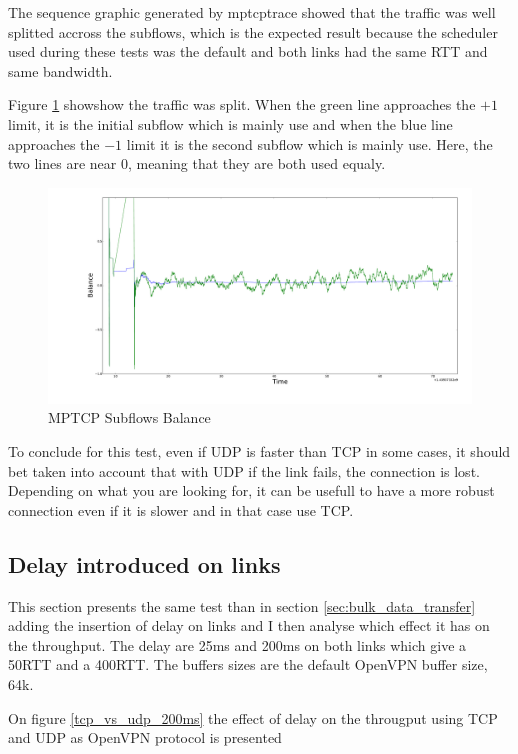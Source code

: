 The sequence graphic generated by mptcptrace showed that the traffic was well splitted accross the subflows, which is the expected result because the scheduler used during these tests was the default and both links had the same RTT and same bandwidth.

Figure \ref{mptcptrace_subflow} showshow the traffic was split. When the green line approaches the $+1$ limit,
it is the initial subflow which is mainly use and when the blue line approaches the $-1$ limit it is the second subflow which is mainly use.
Here, the two lines are near 0, meaning that they are both used equaly.

  \begin{figure}[h!]
    \centering
    \includegraphics[width=16cm]{../results/subflow_split.pdf}
    \caption{MPTCP Subflows Balance}
    \label{mptcptrace_subflow}
  \end{figure}

  To conclude for this test, even if UDP is faster than TCP in some cases, it should bet taken into account that with UDP if the link fails, the connection is lost.
  Depending on what you are looking for, it can be usefull to have a more robust connection even if it is slower and in that case use TCP.


   \subsection{Delay introduced on links} \label{sec:delay_on_links}

   This section presents the same test than in section \ref{sec:bulk_data_transfer} adding the insertion of delay on links and I then analyse which effect it has on the throughput. The delay are 25ms and 200ms on both links which give a 50RTT and a 400RTT. The buffers sizes are the default OpenVPN buffer size, 64k.

On figure \ref{tcp_vs_udp_200ms} the effect of delay on the througput using TCP and UDP as OpenVPN protocol is presented

